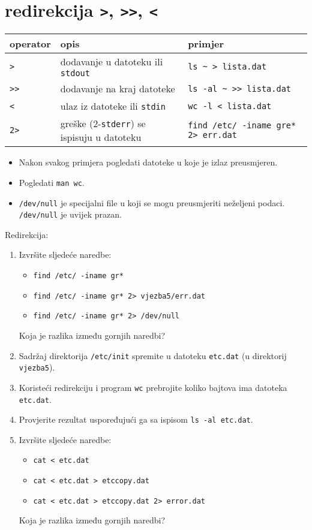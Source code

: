 \section*{redirekcija \lstinline!>!, \lstinline!>>!, \lstinline!<!}

\begin{tabularx}{\textwidth}{lXl}
\hline
operator & opis & primjer\\
\hline
\lstinline!>! & dodavanje u datoteku ili \texttt{stdout} &  \lstinline!ls ~ > lista.dat!\\
\lstinline!>>! & dodavanje na kraj datoteke & \lstinline!ls -al ~ >> lista.dat!\\
\lstinline!<! & ulaz iz datoteke ili \texttt{stdin} & \lstinline!wc -l < lista.dat!\\ 
\lstinline!2>! & greške (2-\texttt{stderr}) se ispisuju u datoteku & \lstinline!find /etc/ -iname gre* 2> err.dat!\\
\hline
\end{tabularx}

\begin{itemize}
 \item Nakon svakog primjera pogledati datoteke u koje je izlaz preusmjeren. 
 \item Pogledati \lstinline!man wc!.
 \item \lstinline!/dev/null! je specijalni file u koji se mogu preusmjeriti neželjeni podaci. \lstinline!/dev/null! je uvijek prazan.\\
\end{itemize}

\begin{zadatak} Redirekcija:
\begin{enumerate}
\item 
Izvršite sljedeće naredbe:
\begin{itemize}
 \item \lstinline!find /etc/ -iname gr*!
\item \lstinline!find /etc/ -iname gr* 2> vjezba5/err.dat!
\item \lstinline!find /etc/ -iname gr* 2> /dev/null!
\end{itemize}             
Koja je razlika između gornjih naredbi?
\item Sadržaj direktorija \lstinline!/etc/init! spremite u datoteku \lstinline!etc.dat! (u direktorij \lstinline!vjezba5!).
\item Koristeći redirekciju i program \lstinline!wc! prebrojite koliko bajtova ima datoteka \lstinline!etc.dat!.
\item Provjerite rezultat uspoređujući ga sa ispisom \lstinline!ls -al etc.dat!.
\item Izvršite sljedeće naredbe:
\begin{itemize}
 \item \lstinline!cat < etc.dat!
\item \lstinline!cat < etc.dat > etccopy.dat!
\item \lstinline!cat < etc.dat > etccopy.dat 2> error.dat!
\end{itemize}
Koja je razlika između gornjih naredbi?
\end{enumerate}
\end{zadatak}

